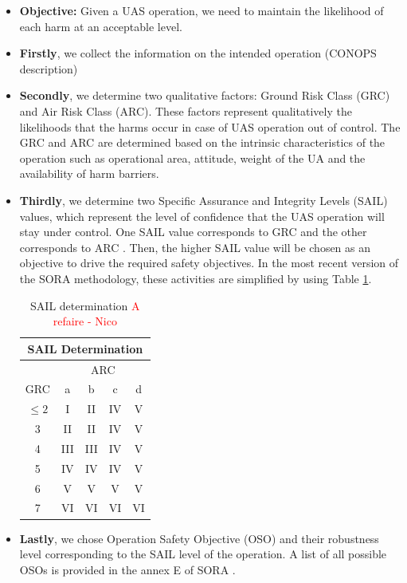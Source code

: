 \documentclass[a4paper, 10, conference]{ieeeconf}  %
\begin{document}
   \begin{itemize}
   	\item \textbf{Objective:} Given a UAS operation, we need to maintain the likelihood of each harm at an acceptable level. 
   	\item \textbf{Firstly}, we collect the information on the intended operation (CONOPS description)
   	\item \textbf{Secondly}, we determine two qualitative factors: Ground Risk Class (GRC) and Air Risk Class (ARC). These factors represent qualitatively the likelihoods that the harms occur in case of UAS operation out of control. The GRC and ARC are determined based on the intrinsic characteristics of the operation such as operational area, attitude, weight of the UA and the availability of harm barriers. 
   	  
   	\item \textbf{Thirdly}, we determine two Specific Assurance and Integrity Levels (SAIL) values, which represent the level of confidence that the UAS operation will stay under control. One SAIL value corresponds to GRC and the other corresponds to ARC \cite{SORAV1}. Then, the higher SAIL value will be chosen as an objective to drive the required safety objectives. In the most recent version of the SORA methodology, these activities are simplified by using Table \ref {tab:SAIL determination}.
   	
   	\begin{table}[!ht]
   		\centering
	   		\begin{tabular}{|c|c|c|c|c|}
	   			\hline
	   			\multicolumn{5}{|c|}{SAIL Determination} \\ \hline
	   			\rowcolor[HTML]{C0C0C0} 
	   			& \multicolumn{4}{c|}{\cellcolor[HTML]{C0C0C0}ARC} \\ \hline
	   			\rowcolor[HTML]{C0C0C0} 
	   			GRC & a & b & c & d \\ \hline
	   			\cellcolor[HTML]{C0C0C0}$\leq2$ & I & II & IV & V \\ \hline
	   			\cellcolor[HTML]{C0C0C0}3 & II & II & IV & V \\ \hline
	   			\cellcolor[HTML]{C0C0C0}4 & III & III & IV & V \\ \hline
	   			\cellcolor[HTML]{C0C0C0}5 & IV & IV & IV & V \\ \hline
	   			\cellcolor[HTML]{C0C0C0}6 & V & V & V & V \\ \hline
	   			\cellcolor[HTML]{C0C0C0}7 & VI & VI & VI & VI \\ \hline
	   		\end{tabular}
   		\caption{SAIL determination \cite{SORAV2} \textcolor{red}{A refaire - Nico}}
   		\label{tab:SAIL determination}
   	\end{table}
   
   	\item \textbf{Lastly}, we chose Operation Safety Objective (OSO) and their robustness level corresponding to the SAIL level of the operation. A list of all possible OSOs is provided in the annex E of SORA \cite{Annex_E_SORA}.
   \end{itemize}
   
\end{document}
